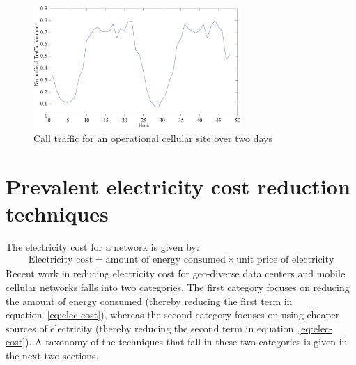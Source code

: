\begin{figure}
\centering
\includegraphics[width=0.7\textwidth]{pics/waridworkload.eps}
\caption{Call traffic for an operational cellular site over two days}
\label{fig:varwork}
\end{figure} 

\section{Prevalent electricity cost reduction techniques} %

The electricity cost for a network is given by:
\begin{align}
\text{Electricity cost} = \text{amount of energy consumed} \times \text{unit price of electricity}
\label{eq:elec-cost}
\end{align}
Recent work in reducing electricity cost for geo-diverse data centers and mobile cellular networks falls into two categories. The first category focuses on reducing the amount of energy consumed (thereby reducing the first term in equation~\ref{eq:elec-cost}), whereas the second category focuses on using cheaper sources of electricity (thereby reducing the second term in equation~\ref{eq:elec-cost}). A taxonomy of the techniques that fall in these two categories is given in the next two sections.

